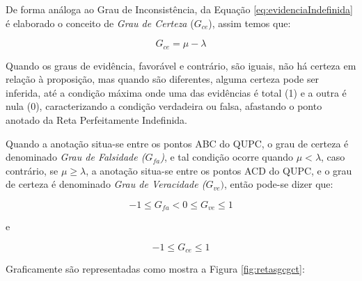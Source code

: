 De forma análoga ao Grau de Inconsistência, da Equação \ref{eq:evidenciaIndefinida} é elaborado o conceito de \emph{Grau de Certeza} ($G_{ce}$), assim temos que: 


\begin{center}
\begin{equation}
G _{ce} = \mu - \lambda
\label{eq:grauCerteza}
\end{equation}
\end{center}

Quando os graus de evidência, favorável e contrário, são iguais, não há certeza em relação à proposição, mas quando são diferentes, alguma certeza pode ser inferida, até a condição máxima onde uma das evidências é total (1) e a outra é nula (0), caracterizando a condição verdadeira ou falsa, afastando o ponto anotado da Reta Perfeitamente Indefinida. 

Quando a anotação situa-se entre os pontos ABC do QUPC, o grau de certeza é denominado \emph{Grau de Falsidade ($G _{fa}$)}, e tal condição ocorre quando $\mu < \lambda $, caso contrário, se $\mu \ge \lambda $, a anotação situa-se entre os pontos ACD do QUPC, e o grau de certeza é denominado \emph{Grau de Veracidade ($G _{ve})$}, então pode-se dizer que:


\begin{center}
\begin{equation}
-1 \le G_{fa}  <  0 \le G_{ve} \le 1
\label{eq:grauVerdadeFalsidade}
\end{equation}
\end{center}
e
\begin{center}
\begin{equation}
-1 \le G_{ce} \le 1
\label{eq:grauCertezaIntervalo}
\end{equation}
\end{center}

Graficamente são representadas como mostra a Figura \ref{fig:retasgcgct}:

%

